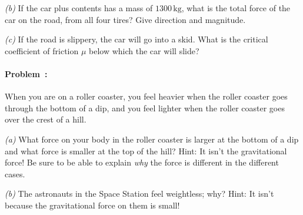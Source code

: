 \documentclass[12pt]{article}
\newcommand{\kg}{\mathrm{kg}}
\begin{document}
\textsl{(b)} If the car plus contents has a mass of $1300\,\kg$, what
is the total force of the car on the road, from all four tires?  Give
direction and magnitude.

\textsl{(c)} If the road is slippery, the car will go into a skid.
What is the critical coefficient of friction $\mu$ below which the car
will slide?

\paragraph{Problem~\theproblem:}%
When you are on a roller coaster, you feel heavier when the roller
coaster goes through the bottom of a dip, and you feel lighter when
the roller coaster goes over the crest of a hill.

\textsl{(a)} What force on your body in the roller coaster is larger
at the bottom of a dip and what force is smaller at the top of the
hill?  Hint: It isn't the gravitational force!  Be sure to be able to
explain \emph{why} the force is different in the different cases.

\textsl{(b)} The astronauts in the Space Station feel weightless; why?
Hint: It isn't because the gravitational force on them is small!
\end{document}
